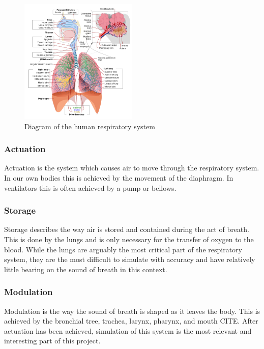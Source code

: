 \documentclass[letterpaper]{article}
\begin{document}
\begin{figure}[h]
\includegraphics[width=0.5\textwidth]{images/respiratorysystem.png}
\caption{Diagram of the human respiratory system}
\end{figure}

\subsubsection{Actuation}

Actuation is the system which causes air to move through the respiratory system. In our own bodies this is achieved by the movement of the diaphragm. In ventilators this is often achieved by a pump or bellows.

\subsubsection{Storage}

Storage describes the way air is stored and contained during the act of breath. This is done by the lungs and is only necessary for the transfer of oxygen to the blood. While the lungs are arguably the most critical part of the respiratory system, they are the most difficult to simulate with accuracy and have relatively little bearing on the sound of breath in this context.

\subsubsection{Modulation}

Modulation is the way the sound of breath is shaped as it leaves the body. This is achieved by the bronchial tree, trachea, larynx, pharynx, and mouth CITE. After actuation has been achieved, simulation of this system is the most relevant and interesting part of this project.   
\end{document}
